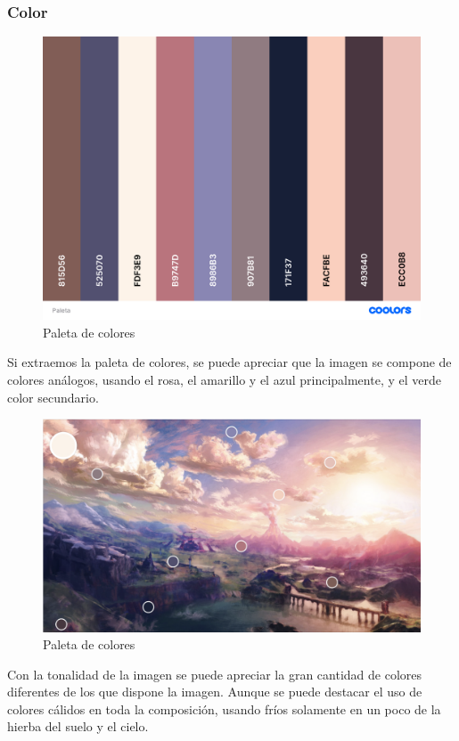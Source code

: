 \documentclass[12pt]{article}
\begin{document}
        \subsubsection{Color}
        
          \begin{figure}[H]
            \centering
            \includegraphics[width=\textwidth]{Jesus/Seccion2/Paleta.png}
            \caption{Paleta de colores}
          \end{figure}
          Si extraemos la paleta de colores, se puede apreciar que la imagen se compone de colores análogos, usando el rosa, el amarillo y el azul principalmente, y el verde color secundario. 
          
          \newpage
          
          \begin{figure}[H]
            \centering
            \includegraphics[width=\textwidth]{Jesus/Seccion2/Tonalidad.png}
            \caption{Paleta de colores}
          \end{figure}
          Con la tonalidad de la imagen se puede apreciar la gran cantidad de colores diferentes de los que dispone la imagen. Aunque se puede destacar el uso de colores cálidos en toda la composición, usando fríos solamente en un poco de la hierba del suelo y el cielo. 
          
\end{document}
